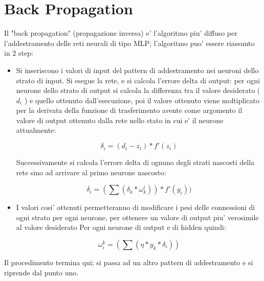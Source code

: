 \documentclass[a4paper,10pt]{report}
\begin{document}
\section{Back Propagation}
Il "back propagation" (propagazione inversa) e' l'algoritmo piu' diffuso
per l'addestramento delle reti neurali di tipo MLP; l'algoritmo puo' essere
riassunto in 2 step:

\begin{itemize}
\item Si inseriscono i valori di input del pattern di addestramento nei neuroni 
dello strato di input. Si esegue la rete, e si calcola l'errore delta di output:
per ogni neurone dello strato di output si calcola la differenza tra il valore 
desiderato ( $ d_i $ ) e quello ottenuto dall'esecuzione, poi il valore ottenuto
viene moltiplicato per la derivata
della funzione di trasferimento avente come argomento il valore di
output ottenuto dalla rete nello stato in cui e' il neurone attualmente:

\[
 \delta_i = (d_i - z_i) * f'(z_i)
\]

Successivamente si calcola l'errore delta di ognuno degli strati nascosti
della rete sino ad arrivare al primo neurone nascosto:

\[
 \delta_i = (\sum (\delta_k * \omega_k^i)) * f'(y_i))
\]



\item I valori cosi' ottenuti permetteranno di modificare i pesi delle connessioni
di ogni strato per ogni neurone, 
per ottenere un valore di output piu' verosimile al valore desiderato
Per ogni neurone di output e di hidden quindi:

\[
 \omega_i^k = (\sum (\eta * y_k * \delta_i))
\]

\end{itemize}

Il procedimento termina qui; si passa ad un altro pattern di addestramento
e si riprende dal punto uno.




\end{document}
